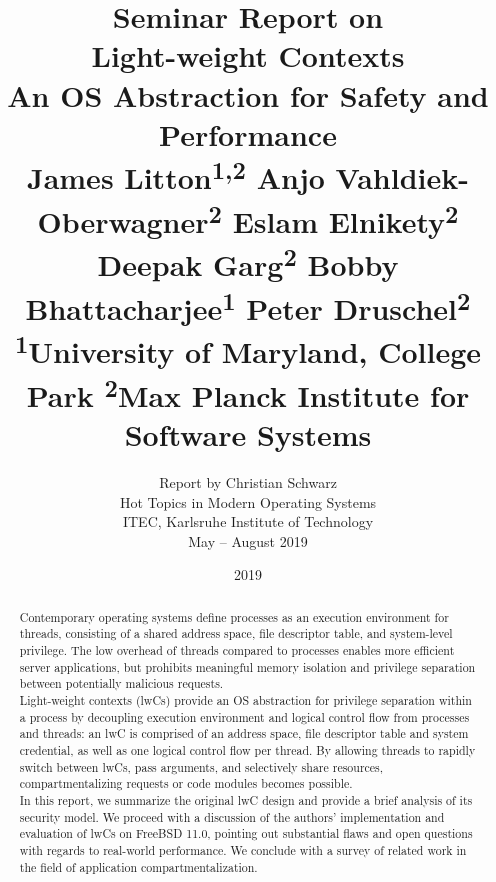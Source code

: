 \documentclass[10pt,twocolumn,a4paper]{article}
\begin{document}
\title{%
  {\normalfont \normalsize Seminar Report on}\\%
  Light-weight Contexts\\%
  {\normalfont \normalsize An OS Abstraction for Safety and Performance}\\%
  {\normalfont \small %
    James Litton\textsuperscript{1,2}
    Anjo Vahldiek-Oberwagner\textsuperscript{2}
    Eslam Elnikety\textsuperscript{2}
    Deepak Garg\textsuperscript{2}
    Bobby Bhattacharjee\textsuperscript{1}
    Peter Druschel\textsuperscript{2}
  }\\
  {\normalfont \small
    \textsuperscript{1}University of Maryland, College Park 
    \textsuperscript{2}Max Planck Institute for Software Systems
  }%
}
\author{%
Report by Christian Schwarz\\%
{\small Hot Topics in Modern Operating Systems}\\%
{\small ITEC, Karlsruhe Institute of Technology}\\%
{\small May -- August 2019}\\%
\vspace{1em}
}
\date{2019}

\maketitle

\begin{abstract}
Contemporary operating systems define processes as an execution environment for threads, consisting of a shared address space, file descriptor table, and system-level privilege.
The low overhead of threads compared to processes enables more efficient server applications, but prohibits meaningful memory isolation and privilege separation between potentially malicious requests.\\
Light-weight contexts (lwCs) provide an OS abstraction for privilege separation within a process by decoupling execution environment and logical control flow from processes and threads:
an lwC is comprised of an address space, file descriptor table and system credential, as well as one logical control flow per thread.
By allowing threads to rapidly switch between lwCs, pass arguments, and selectively share resources, compartmentalizing requests or code modules becomes possible.\\
In this report, we summarize the original lwC design and provide a brief analysis of its security model.
We proceed with a discussion of the authors' implementation and evaluation of lwCs on FreeBSD 11.0, pointing out substantial flaws and open questions with regards to real-world performance.
We conclude with a survey of related work in the field of application compartmentalization.
\end{abstract}
\end{document}
